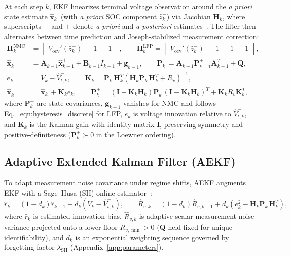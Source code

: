 \documentclass[10pt,a4paper]{article}
\begin{document}
At each step $k$, EKF linearizes terminal voltage observation around the \emph{a priori} state estimate $\hat{\mathbf{x}}_k^-$ (with \emph{a priori} SOC component $\hat{z}_k^-$) via Jacobian $\mathbf{H}_k$, where superscripts $-$ and $+$ denote \emph{a priori} and \emph{a posteriori} estimates~\cite{Plett2004part3}. The filter then alternates between time prediction and Joseph-stabilized measurement correction:
\begin{align}
\mathbf{H}_k^{\text{NMC}} &= \begin{bmatrix} V_{\text{ocv}}'(\hat{z}_k^-) & -1 & -1 \end{bmatrix}, \qquad
\mathbf{H}_k^{\text{LFP}} = \begin{bmatrix} V_{\text{ocv}}'(\hat{z}_k^-) & -1 & -1 & -1 \end{bmatrix}, \label{eqn:ekf_jacobian}\\
\hat{\mathbf{x}}_k^- &= \mathbf{A}_{k-1} \hat{\mathbf{x}}_{k-1}^+ + \mathbf{B}_{k-1} I_{k-1} + \mathbf{g}_{k-1}, \qquad
\mathbf{P}_k^- = \mathbf{A}_{k-1} \mathbf{P}_{k-1}^+ \mathbf{A}_{k-1}^T + \mathbf{Q}, \label{eqn:ekf_pred_cov}\\
e_k &= V_k - \hat{V}_{t,k}^-, \qquad \mathbf{K}_k = \mathbf{P}_k^- \mathbf{H}_k^T \left( \mathbf{H}_k \mathbf{P}_k^- \mathbf{H}_k^T + R_v \right)^{-1}, \label{eqn:ekf_gain}\\
\hat{\mathbf{x}}_k^+ &= \hat{\mathbf{x}}_k^- + \mathbf{K}_k e_k, \qquad
\mathbf{P}_k^+ = (\mathbf{I} - \mathbf{K}_k \mathbf{H}_k) \mathbf{P}_k^- (\mathbf{I} - \mathbf{K}_k \mathbf{H}_k)^T + \mathbf{K}_k R_v \mathbf{K}_k^T, \label{eqn:ekf_joseph}
\end{align}
where $\mathbf{P}_k^\pm$ are state covariances, $\mathbf{g}_{k-1}$ vanishes for NMC and follows Eq.~\eqref{eqn:hysteresis_discrete} for LFP, $e_k$ is voltage innovation relative to $\hat{V}_{t,k}^-$, and $\mathbf{K}_k$ is the Kalman gain with identity matrix $\mathbf{I}$, preserving symmetry and positive-definiteness ($\mathbf{P}_k^+ \succ 0$ in the Loewner ordering).

\subsection{Adaptive Extended Kalman Filter (AEKF)}
To adapt measurement noise covariance under regime shifts, AEKF augments EKF with a Sage--Husa (SH) online estimator~\cite{Xiang2022aekf}:
\begin{equation}\label{eqn:sh_meas_cov}
\hat{r}_k = (1 - d_k)\hat{r}_{k-1} + d_k \left( V_k - \hat{V}_{t,k}^- \right), \qquad
\hat{R}_{v,k} = (1 - d_k)\hat{R}_{v,k-1} + d_k \left( e_k^2 - \mathbf{H}_k \mathbf{P}_k^- \mathbf{H}_k^T \right),
\end{equation}
where $\hat{r}_k$ is estimated innovation bias, $\hat{R}_{v,k}$ is adaptive scalar measurement noise variance projected onto a lower floor $R_{v,\min} > 0$ ($\mathbf{Q}$ held fixed for unique identifiability), and $d_k$ is an exponential weighting sequence governed by forgetting factor $\lambda_{\text{SH}}$ (Appendix~\ref{app:parameters}).
\end{document}
